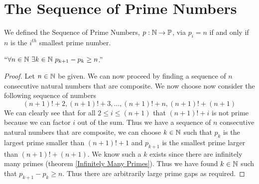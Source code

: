     \section{The Sequence of Prime Numbers}
        \begin{definition}
            We defined the Sequence of Prime Numbers, $p: \mathbb{N} \rightarrow \mathbb{P}$, via
            $p_i = n$ if and only if $n$ is the $i^{th}$ smallest prime number.
        \end{definition}
        \begin{theorem}
            $``\forall n \in \mathbb{N} \ \exists k \in \mathbb{N} \ p_{k + 1} - p_{k} \ge n$.''
        \end{theorem}
        \begin{proof}
            Let $n \in \mathbb{N}$ be given. We can now proceed by finding a sequence of $n$ consecutive
            natural numbers that are composite. We now choose now consider the following sequence of
            numbers
            \[
                (n + 1)! + 2, (n + 1)! + 3, \dots, (n + 1)! + n, (n + 1)! + (n + 1)
            \]
            We can clearly see that for all $2 \le i \le (n + 1)$ that $(n + 1)! + i$
            is not prime because we can factor $i$ out of the sum. Thus we have a sequence of $n$
            consecutive natural numbers that are composite, we can choose $k \in \mathbb{N}$ such
            that $p_k$ is the largest prime smaller than $(n + 1)! + 1$ and $p_{k + 1}$ is the
            smallest prime larger than $(n + 1)! + (n + 1)$. We know such a $k$ exists since there
            are infinitely many primes (theorem \ref{Infinitely Many Primes}). Thus we have found
            $k \in \mathbb{N}$ such that $p_{k + 1} - p_k \ge n$. Thus there are arbitrarily large
            prime gaps as required. \QED
        \end{proof}
